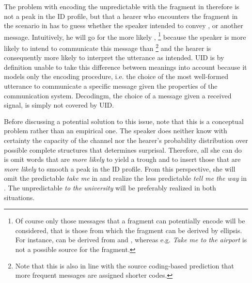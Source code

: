 The problem with encoding the unpredictable \Last[c] with the fragment in \Last[a] therefore is not a peak in the ID profile, but that a hearer who encounters the fragment in the scenario in \Last has to guess whether the speaker intended to convey \Last[b], \Last[c] or another message. Intuitively, he will go for the more likely \Last[b],%
% 
\footnote{Of course only those messages that a fragment can potentially encode will be considered, that is those from which the fragment can be derived by ellipsis. For instance, \Last[a] can be derived from \Last[b] and \Last[c], whereas e.g. \textit{Take me to the airport} is not a possible source for the fragment.}\afterfn%
%
because the speaker is more likely to intend to communicate this message than \Last[c]%
%
\footnote{Note that this is also in line with the source coding-based prediction that more frequent messages are assigned shorter codes.}\afterfn%
%
and the hearer is consequently more likely to interpret the utterance as intended. UID is by definition unable to take this difference between meanings into account because it models only the encoding procedure, i.e. the choice of the most well-formed utterance to communicate a specific message given the properties of the communication system. Decodingm, the choice of a message given a received signal, is simply not covered by UID.

Before discussing a potential solution to this issue, note that this is a conceptual problem rather than an empirical one. The speaker does neither know with certainty the capacity of the channel nor the hearer's probability distribution over possible complete structures that determines surprisal. Therefore, all she can do is omit words that are \textit{more likely} to yield a trough and to insert those that are \textit{more likely} to smooth a peak in the ID profile. From this perspective, she will omit the predictable \textit{take me} in \Last[b] and realize the less predictable \textit{tell me the way} in \Last[c]. The unpredictable \textit{to the university} will be preferably realized in both situations.

